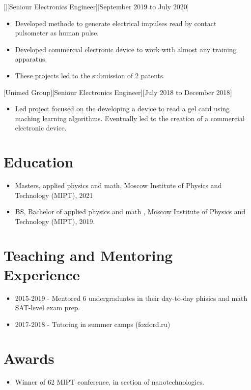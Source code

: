 \documentclass{article}
\begin{document}
[][Seniour Electronics Engineer][September 2019 to July 2020]

\begin{itemize}
\item Developed methode to generate electrical impulses read by contact pulsometer as human pulse.
\item Developed commercial electronic device to work with almost any training apparatus.
\item These projects led to the submission of 2 patents.
\end{itemize}

[Unimed Group][Seniour Electronics Engineer][July 2018 to December 2018]

\begin{itemize}
\item Led project focused on the developing a device to read a gel card using maching learning algorithms. Eventually led to the creation of a commercial electronic device.
\end{itemize}


\section{Education}

\begin{itemize}
\item Masters, applied physics and math, Moscow Institute of Physics and Technology (MIPT), 2021
\item BS, Bachelor of applied physics and math , Moscow Institute of Physics and Technology (MIPT), 2019.
\end{itemize}

\section{Teaching and Mentoring Experience }
\begin{itemize}
\item 2015-2019 - Mentored 6 undergraduates in their day-to-day phisics and math SAT-level exam prep.
\item 2017-2018 - Tutoring in summer camps (foxford.ru)
\end{itemize}

\section{Awards}
\begin{itemize}
\item Winner of 62 MIPT conference, in section of nanotechnologies.
\end{itemize}
\end{document}
